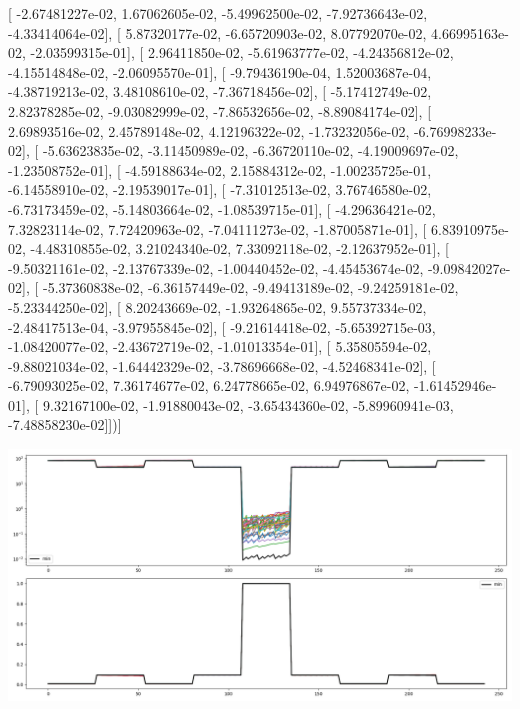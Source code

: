 \documentclass{article}
\begin{document}
       [ -2.67481227e-02,   1.67062605e-02,  -5.49962500e-02,
         -7.92736643e-02,  -4.33414064e-02],
       [  5.87320177e-02,  -6.65720903e-02,   8.07792070e-02,
          4.66995163e-02,  -2.03599315e-01],
       [  2.96411850e-02,  -5.61963777e-02,  -4.24356812e-02,
         -4.15514848e-02,  -2.06095570e-01],
       [ -9.79436190e-04,   1.52003687e-04,  -4.38719213e-02,
          3.48108610e-02,  -7.36718456e-02],
       [ -5.17412749e-02,   2.82378285e-02,  -9.03082999e-02,
         -7.86532656e-02,  -8.89084174e-02],
       [  2.69893516e-02,   2.45789148e-02,   4.12196322e-02,
         -1.73232056e-02,  -6.76998233e-02],
       [ -5.63623835e-02,  -3.11450989e-02,  -6.36720110e-02,
         -4.19009697e-02,  -1.23508752e-01],
       [ -4.59188634e-02,   2.15884312e-02,  -1.00235725e-01,
         -6.14558910e-02,  -2.19539017e-01],
       [ -7.31012513e-02,   3.76746580e-02,  -6.73173459e-02,
         -5.14803664e-02,  -1.08539715e-01],
       [ -4.29636421e-02,   7.32823114e-02,   7.72420963e-02,
         -7.04111273e-02,  -1.87005871e-01],
       [  6.83910975e-02,  -4.48310855e-02,   3.21024340e-02,
          7.33092118e-02,  -2.12637952e-01],
       [ -9.50321161e-02,  -2.13767339e-02,  -1.00440452e-02,
         -4.45453674e-02,  -9.09842027e-02],
       [ -5.37360838e-02,  -6.36157449e-02,  -9.49413189e-02,
         -9.24259181e-02,  -5.23344250e-02],
       [  8.20243669e-02,  -1.93264865e-02,   9.55737334e-02,
         -2.48417513e-04,  -3.97955845e-02],
       [ -9.21614418e-02,  -5.65392715e-03,  -1.08420077e-02,
         -2.43672719e-02,  -1.01013354e-01],
       [  5.35805594e-02,  -9.88021034e-02,  -1.64442329e-02,
         -3.78696668e-02,  -4.52468341e-02],
       [ -6.79093025e-02,   7.36174677e-02,   6.24778665e-02,
          6.94976867e-02,  -1.61452946e-01],
       [  9.32167100e-02,  -1.91880043e-02,  -3.65434360e-02,
         -5.89960941e-03,  -7.48858230e-02]])]
\begin{center}
\includegraphics[scale=.9]{report_pickled_controls106/control_dpn_all.png}

\end{center}
\end{document}
